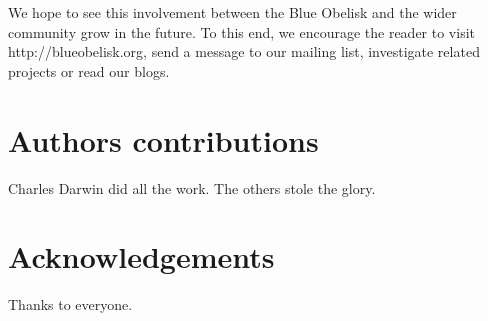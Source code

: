 \documentclass[10pt]{bmc_article}
\newenvironment{bmcformat}{\fussy\setboolean{publ}{true}}{\fussy}
\begin{document}
\begin{bmcformat}
We hope to see this involvement between the Blue Obelisk and the wider
community grow in the future. To this end, we encourage the reader to
visit http://blueobelisk.org, send a message to our mailing list,
investigate related projects or read our blogs.


\section*{Authors contributions}
   Charles Darwin did all the work. The others stole the glory.


\section*{Acknowledgements}
  Thanks to everyone.





{
   }     %





\end{bmcformat}
\end{document}
